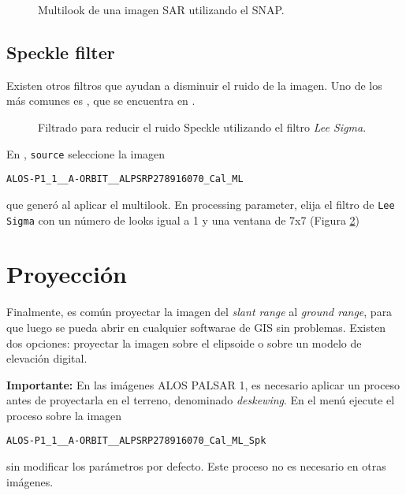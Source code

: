\begin{figure}[h!]
    \centering
    \hspace{1cm}
    \caption{Multilook de una imagen SAR utilizando el SNAP.}
    \label{fig:multilook}
\end{figure}

\subsection{Speckle filter}

Existen otros filtros que ayudan a disminuir el ruido de la imagen. Uno de los más comunes es  , que se encuentra en .

\begin{figure}[h!]
    \centering
    \hspace{1cm}
    \caption{Filtrado para reducir el ruido Speckle utilizando el filtro \emph{Lee Sigma}.}
    \label{fig:lee}
\end{figure}

En , \texttt{source} seleccione la imagen
\begin{center}
  \texttt{ALOS-P1\_1\_\_A-ORBIT\_\_ALPSRP278916070\_Cal\_ML}
  \end{center}
  que generó al aplicar el multilook. En processing parameter, elija el filtro de \texttt{Lee Sigma} con un número de looks igual a 1 y una ventana de 7x7 (Figura \ref{fig:lee})

\section{Proyección}

Finalmente, es común proyectar la imagen del \emph{slant range} al \emph{ground range}, para que luego se pueda abrir en cualquier softwarae de GIS sin problemas. Existen dos opciones: proyectar la imagen sobre el elipsoide o sobre un modelo de elevación digital.

{\bf Importante:} En las imágenes ALOS PALSAR 1, es necesario aplicar un proceso antes de proyectarla en el terreno, denominado \emph{deskewing}. En el menú  ejecute el proceso sobre la imagen
\begin{center} \texttt{ALOS-P1\_1\_\_A-ORBIT\_\_ALPSRP278916070\_Cal\_ML\_Spk} \end{center} sin modificar los parámetros por defecto. Este proceso no es necesario en otras imágenes.

